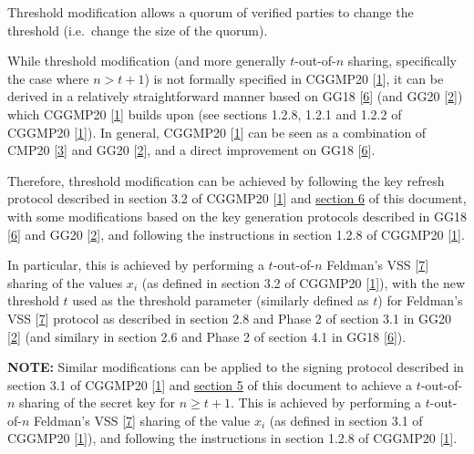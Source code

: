 \documentclass[
]{article}
\begin{document}
Threshold modification allows a quorum of verified parties to change the
threshold (i.e.~change the size of the quorum).

While threshold modification (and more generally \(t\)-out-of-\(n\)
sharing, specifically the case where \(n > t+1\)) is not formally
specified in CGGMP20 {[}\protect\hyperlink{ref-cggmp20}{1}{]}, it can be
derived in a relatively straightforward manner based on GG18
{[}\protect\hyperlink{ref-gg18}{6}{]} (and GG20
{[}\protect\hyperlink{ref-gg20}{2}{]}) which CGGMP20
{[}\protect\hyperlink{ref-cggmp20}{1}{]} builds upon (see sections
1.2.8, 1.2.1 and 1.2.2 of CGGMP20
{[}\protect\hyperlink{ref-cggmp20}{1}{]}). In general, CGGMP20
{[}\protect\hyperlink{ref-cggmp20}{1}{]} can be seen as a combination of
CMP20 {[}\protect\hyperlink{ref-cmp20}{3}{]} and GG20
{[}\protect\hyperlink{ref-gg20}{2}{]}, and a direct improvement on GG18
{[}\protect\hyperlink{ref-gg18}{6}{]}.

Therefore, threshold modification can be achieved by following the key
refresh protocol described in section 3.2 of CGGMP20
{[}\protect\hyperlink{ref-cggmp20}{1}{]} and
\protect\hyperlink{key-refresh}{section 6} of this document, with some
modifications based on the key generation protocols described in GG18
{[}\protect\hyperlink{ref-gg18}{6}{]} and GG20
{[}\protect\hyperlink{ref-gg20}{2}{]}, and following the instructions in
section 1.2.8 of CGGMP20 {[}\protect\hyperlink{ref-cggmp20}{1}{]}.

In particular, this is achieved by performing a \(t\)-out-of-\(n\)
Feldman's VSS {[}\protect\hyperlink{ref-feldman-vss}{7}{]} sharing of
the values \(x_i\) (as defined in section 3.2 of CGGMP20
{[}\protect\hyperlink{ref-cggmp20}{1}{]}), with the new threshold \(t\)
used as the threshold parameter (similarly defined as \(t\)) for
Feldman's VSS {[}\protect\hyperlink{ref-feldman-vss}{7}{]} protocol as
described in section 2.8 and Phase 2 of section 3.1 in GG20
{[}\protect\hyperlink{ref-gg20}{2}{]} (and similary in section 2.6 and
Phase 2 of section 4.1 in GG18 {[}\protect\hyperlink{ref-gg18}{6}{]}).

\textbf{NOTE:} Similar modifications can be applied to the signing
protocol described in section 3.1 of CGGMP20
{[}\protect\hyperlink{ref-cggmp20}{1}{]} and
\protect\hyperlink{signing}{section 5} of this document to achieve a
\(t\)-out-of-\(n\) sharing of the secret key for \(n \geq t+1\). This is
achieved by performing a \(t\)-out-of-\(n\) Feldman's VSS
{[}\protect\hyperlink{ref-feldman-vss}{7}{]} sharing of the value
\(x_i\) (as defined in section 3.1 of CGGMP20
{[}\protect\hyperlink{ref-cggmp20}{1}{]}), and following the
instructions in section 1.2.8 of CGGMP20
{[}\protect\hyperlink{ref-cggmp20}{1}{]}.
\end{document}
